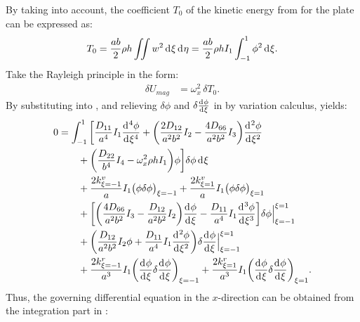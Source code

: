\documentclass[preprint,12pt]{elsarticle}
\newcommand{\id}{\mathrm{d}\mkern1mu}
\begin{document}
%
By taking  into account, the coefficient $T_0$ of the kinetic energy from  for the plate can be expressed as:
%
\begin{equation}\label{eq:kine_energyx}
	\begin{split}
		T_0 = \frac{ab}{2}\rho h\iint w^2 \, \id \xi \, \id \eta = \frac{ab}{2}\rho h I_1\int_{-1}^{1} \phi^2 \, \id \xi.
	\end{split}
\end{equation}
%
Take the Rayleigh principle in the form:
%
\begin{equation}\label{eq:Rayleighx}
	\begin{split}
		\delta U_{mag} &= \omega_x^2 \, \delta T_0.
	\end{split}
\end{equation}
%
By substituting  into , and relieving $\delta \phi$ and $\delta\frac{\id  \phi}{\id \xi}$ in  by variation calculus, yields:
%
\begin{equation}\label{eq:Rayleighx2}
	\begin{split}
		0 &= \int_{-1}^{1} \bigg[ \frac{D_{11}}{a^4} I_1 \frac{\id^4 \phi}{\id \xi^4} 
		+ \bigg( \frac{2D_{12}}{a^2b^2} I_2 - \frac{4D_{66}}{a^2b^2} I_3 \bigg) \frac{\id^2 \phi}{\id \xi^2} \\
		&\qquad + \bigg( \frac{D_{22}}{b^4} I_4 - \omega_x^2 \rho h I_1 \bigg) \phi \bigg] \delta \phi \, \id \xi \\
		&\qquad + \frac{2k^v_{\xi=-1}}{a} I_1 \big(\phi \delta \phi\big)_{\xi=-1} 
		+ \frac{2k^v_{\xi=1}}{a} I_1 \big(\phi \delta \phi\big)_{\xi=1} \\
		&\qquad + \bigg[ \bigg( \frac{4D_{66}}{a^2b^2} I_3 - \frac{D_{12}}{a^2b^2} I_2 \bigg) \frac{\id \phi}{\id \xi} 
		- \frac{D_{11}}{a^4} I_1 \frac{\id^3 \phi}{\id \xi^3} \bigg] \delta \phi \Big|^{\xi=1}_{\xi=-1} \\
		&\qquad + \bigg( \frac{D_{12}}{a^2b^2} I_2 \phi + \frac{D_{11}}{a^4} I_1 \frac{\id^2 \phi}{\id \xi^2} \bigg) 
		\delta\frac{\id  \phi}{\id \xi} \Big|^{\xi=1}_{\xi=-1} \\
		&\qquad + \frac{2k^r_{\xi=-1}}{a^3} I_1 \bigg(\frac{\id \phi}{\id \xi}\delta \frac{\id \phi}{\id \xi}\bigg)_{\xi=-1} 
		+ \frac{2k^r_{\xi=1}}{a^3} I_1 \bigg(\frac{\id \phi}{\id \xi} \delta\frac{\id \phi}{\id \xi}\bigg)_{\xi=1}.
	\end{split}
\end{equation}
%
Thus, the governing differential equation in the $ x $-direction can be obtained from the integration part in :
\end{document}

